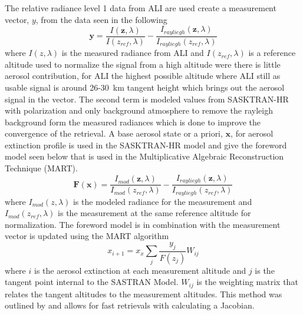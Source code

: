 \documentclass[12pt, draft]{article}
\begin{document}
The relative radiance level 1 data from ALI are used create a measurement vector, $y$, from the data seen in the following
\begin{equation}
    \mathbf{y} = \frac{I(\mathbf{z},\lambda)}{I(z_{ref},\lambda)}-\frac{I_{rayliegh}(\mathbf{z},\lambda)}{I_{rayliegh}(z_{ref},\lambda)}
    \label{eqn:measurementVector}
\end{equation}
where $I(z,\lambda)$ is the measured radiance from ALI and $I(z_{ref},\lambda)$ is a reference altitude used to normalize the signal from a high altitude were there is little aerosol contribution, for ALI the highest possible altitude where ALI still as usable signal is around 26-30~km tangent height which brings out the aerosol signal in the vector. The second term is modeled values from SASKTRAN-HR with polarization and only background atmosphere to remove the rayleigh background form the measured radiances which is done to improve the convergence of the retrieval. A base aerosol state or a priori, $\mathbf{x}$, for aerosol extinction profile is used in the SASKTRAN-HR model and give the foreword model seen below that is used in the Multiplicative Algebraic Reconstruction Technique (MART).
\begin{equation}
    \mathbf{F}(\mathbf{x}) = \frac{I_{mod}(
    \mathbf{z},\lambda)}{I_{mod}(z_{ref},\lambda)}-\frac{I_{rayliegh}(\mathbf{z},\lambda)}{I_{rayliegh}(z_{ref},\lambda)}
    \label{eqn:forewordModel}
\end{equation}
where $I_{mod}(z,\lambda)$ is the modeled radiance for the measurement and $I_{mod}(z_{ref},\lambda)$ is the measurement at the same reference altitude for normalization. The foreword model is in combination with the measurement vector is updated using the MART algorithm
\begin{equation}
    x_{i+1} = x_{x}\sum_{j}\frac{y_{j}}{F(z_{j})}W_{ij}
\end{equation}
where $i$ is the aerosol extinction at each measurement altitude and $j$ is the tangent point internal to the SASTRAN Model. $W_{ij}$ is the weighting matrix that relates the tangent altitudes to the measurement altitudes. This method was outlined by \cite{Degenstein2009} and allows for fast retrievals with calculating a Jacobian.
\end{document}
